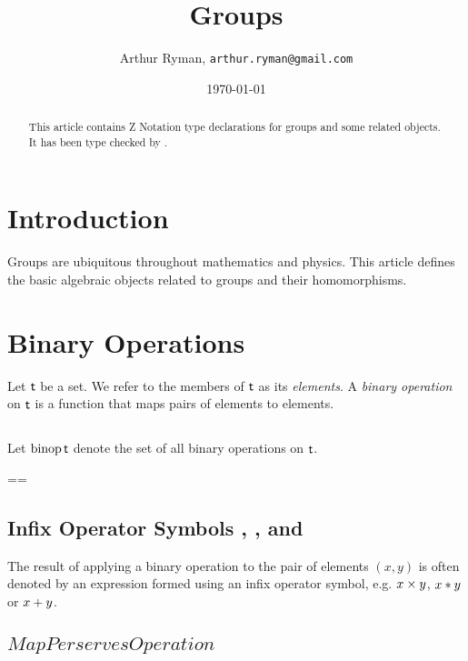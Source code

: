 \documentclass[11pt, oneside]{article}
\title{Groups}
\author{Arthur Ryman, {\tt arthur.ryman@gmail.com}}
\date{\today}
\begin{document}
\maketitle

\begin{abstract}
This article contains Z Notation type declarations for groups and some related objects.
It has been type checked by \fuzz.
\end{abstract}

\section{Introduction}

Groups are ubiquitous throughout mathematics and physics.
This article defines the basic algebraic objects related to groups and their homomorphisms.

\section{Binary Operations}

Let $\mathsf{t}$ be a set. We refer to the members of $\mathsf{t}$ as its {\em elements}.
A {\em binary operation} on $\mathsf{t}$ is a function that maps pairs of elements to elements.

\subsection{}

Let $\operatorname{binop} \mathsf{t}$ denote the set of all binary operations on $\mathsf{t}$.

\begin{zed}
\binop \genT == \genT \cross \genT \fun \genT
\end{zed}

\subsection{Infix Operator Symbols , , and }

The result of applying a binary operation to the pair of elements $(x, y)$ 
is often denoted by an expression formed using an infix operator symbol,
e.g. $x \mathbin{\times} y$, $x \mathbin{*} y$ or $x \mathbin{+} y$.

\subsection{$MapPerservesOperation$}
\end{document}
